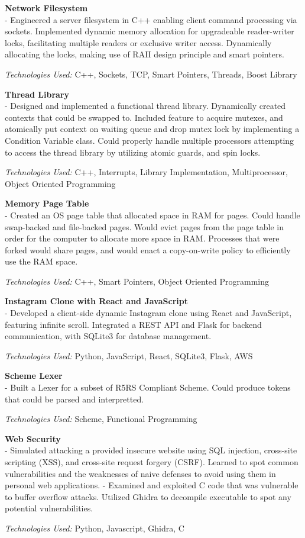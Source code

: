 \documentclass[9pt]{extarticle}
\begin{document}
\noindent \textbf{Network Filesystem} \\
- Engineered a server filesystem in C++ enabling client command processing via sockets.
Implemented dynamic memory allocation for upgradeable reader-writer locks,
facilitating multiple readers or exclusive writer access. Dynamically allocating the locks, making use of RAII design principle and smart pointers.

\textit{Technologies Used:} C++, Sockets, TCP, Smart Pointers, Threads, Boost Library

\noindent \textbf{Thread Library} \\
- Designed and implemented a functional thread library. Dynamically created contexts that could be swapped to.
Included feature to acquire mutexes, and atomically put context on waiting queue and drop mutex lock by implementing a Condition Variable class.
Could properly handle multiple processors attempting to access the thread library by utilizing atomic guards, and spin locks.

\textit{Technologies Used:} C++, Interrupts, Library Implementation, Multiprocessor, Object Oriented Programming


\noindent \textbf{Memory Page Table}\\
- Created an OS page table that allocated space in RAM for pages. Could handle swap-backed and file-backed pages.
Would evict pages from the page table in order for the computer to allocate more space in RAM.
Processes that were forked would share pages, and would enact a copy-on-write policy to efficiently use the RAM space.

\textit{Technologies Used:} C++, Smart Pointers, Object Oriented Programming

\noindent \textbf{Instagram Clone with React and JavaScript} \\
- Developed a client-side dynamic Instagram clone using React and JavaScript,
featuring infinite scroll. Integrated a REST API and Flask for backend communication,
with SQLite3 for database management.

\textit{Technologies Used:} Python, JavaScript, React, SQLite3, Flask, AWS

\noindent \textbf{Scheme Lexer} \\
- Built a Lexer for a subset of R5RS Compliant Scheme. Could produce tokens that could be parsed and interpretted.

\textit{Technologies Used:} Scheme, Functional Programming

\noindent \textbf{Web Security} \\
- Simulated attacking a provided insecure website using SQL
injection, cross-site scripting (XSS), and cross-site request forgery
(CSRF). Learned to spot common vulnerabilities and the
weaknesses of naive defenses to avoid using them in personal web
applications.
- Examined and exploited C code that was vulnerable to buffer overflow attacks. Utilized Ghidra to
decompile executable to spot any potential vulnerabilities.

\textit{Technologies Used:} Python, Javascript, Ghidra, C
\end{document}
